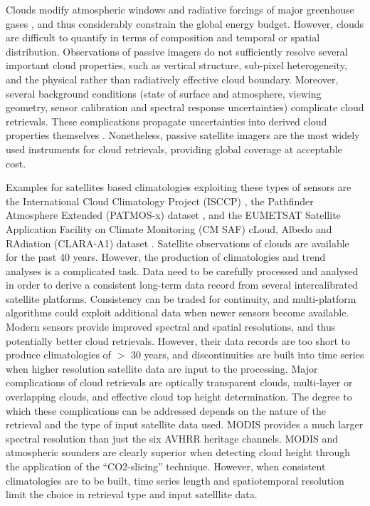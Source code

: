 Clouds modify atmospheric windows and radiative forcings of major greenhouse
gases \citep{Kiehl97}, and thus considerably constrain the global energy
budget. However, clouds are difficult to quantify in terms of composition and
temporal or spatial distribution. Observations of passive imagers do not
sufficiently resolve several important cloud properties, such as
vertical structure, sub-pixel heterogeneity, and the physical rather than radiatively
effective cloud boundary. Moreover, several background conditions (state of
surface and atmosphere, viewing geometry, sensor calibration and spectral
response uncertainties) complicate cloud retrievals. These
complications propagate uncertainties into derived cloud properties
themselves \citep{Hamann14}. Nonetheless, passive satellite imagers are the
most widely used instruments for cloud retrievals, providing global coverage at
acceptable cost. 

Examples for satellites based climatologies exploiting these types of sensors are the
International Cloud Climatology Project (ISCCP) \citep{Rossow99}, the
Pathfinder Atmosphere Extended (PATMOS-x) dataset
\citep{Heidinger09,Heidinger12}, and the EUMETSAT Satellite Application
Facility on Climate Monitoring (CM SAF) cLoud, Albedo and RAdiation (CLARA-A1)
dataset \citep{Karlsson13}.
Satellite observations of clouds are available for the past 40 years. However,
the production of climatologies and trend analyses is a complicated
task. Data need to be carefully processed and analysed in order
to derive a consistent long-term data record from several intercalibrated satellite
platforms. Consistency can be traded for continuity, and multi-platform
algorithms could exploit additional data when newer sensors become
available. Modern sensors provide improved spectral and spatial resolutions,
and thus potentially better cloud retrievals. However, their data records are too short to produce
climatologies of $>$ 30 years, and discontinuities are built into time series
when higher resolution satellite data are input to the processing.
Major complications of cloud retrievals are optically transparent clouds, multi-layer or overlapping clouds, and effective cloud top height determination. The degree to which these complications can be addressed depends on the nature of the retrieval and the type of input satellite data used. MODIS provides a much larger spectral resolution than just the six AVHRR heritage channels. MODIS and atmospheric sounders are clearly superior when detecting cloud height through the application of the ``CO2-slicing'' technique. However, when consistent climatologies are to be built, time series length and spatiotemporal resolution limit the choice in retrieval type and input satelllite data.  


